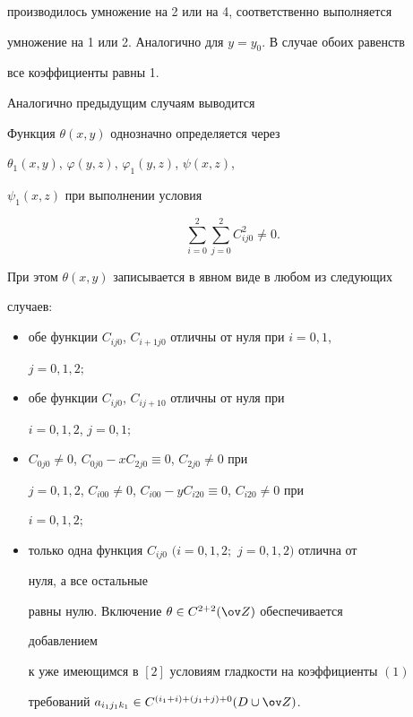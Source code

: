 производилось умножение на 2 или на 4, соответственно выполняется 


умножение на 1 или 2. Аналогично для $y=y_0$. В случае обоих равенств 


все коэффициенты равны 1. 


 


Аналогично предыдущим случаям выводится 


 


\begin{thm} 


Функция $\theta(x,y)$ однозначно определяется через 


$\theta_1(x,y)$, $\varphi(y,z)$, $\varphi_1(y,z)$, $\psi(x,z)$, 


$\psi_1(x,z)$ при выполнении условия 


$$ 


\sum^2_{i=0}\sum^2_{j=0}C^2_{ij0}\ne0. 


$$ 


 


При этом $\theta(x,y)$ записывается в явном виде в любом из следующих 


случаев\/${:}$ 


\begin{itemize} 


\item[1)] обе функции $C_{ij0}$, $C_{i+1j0}$ отличны от нуля при $i=0,1$, 


$j=0,1,2;$ 


\item[2)] обе функции $C_{ij0}$, $C_{ij+10}$ отличны от нуля при 


$i=0,1,2$, $j=0,1;$ 


\item[3)] $C_{0j0}\ne0$, $C_{0j0}-xC_{2j0}\equiv0$, $C_{2j0}\ne0$ при 


$j=0,1,2$, $C_{i00}\ne0$, $C_{i00}-yC_{i20}\equiv0$, $C_{i20}\ne0$ при 


$i=0,1,2;$ 


\item[4)] только одна функция $C_{ij0}$ $(i=0,1,2;$ $j=0,1,2)$ отлична от 


нуля, а все остальные 


равны нулю. Включение $\theta\in C^{2+2}(\ov Z)$ обеспечивается 


добавлением 


к уже имеющимся в $[2]$ условиям гладкости на коэффициенты $(1)$ 


требований $a_{i_1j_1k_1}\in C^{(i_1+i)+(j_1+j)+0}(D\cup\ov Z)$. 


\end{itemize} 


\end{thm} 


